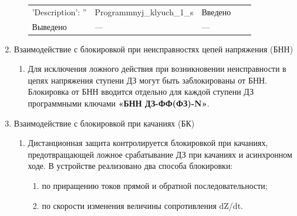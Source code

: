 \begin{enumerate}[label=\arabic{section}.\arabic{subsection}.\arabic{enumi}, labelsep=4pt, leftmargin=0pt, itemindent=57pt, itemsep=0pt, parsep=5pt]
\begin{enumerate}[label=\arabic{section}.\arabic{subsection}.\arabic{enumi}.\arabic*, labelsep=4pt, leftmargin=0em, itemindent=65pt, parsep=0pt]
\begin{longtable}{|>{\centering\arraybackslash}m{5.3cm}|>{\centering\arraybackslash}m{3.3cm}|>{\centering\arraybackslash}m{4.2cm}|>{\centering\arraybackslash}m{1.8cm}|>{\centering\arraybackslash}m{1cm}|}
\raggedright {'Description': ''} & \centering Programmnyj_klyuch_1_s & \centering Введено \\ Выведено & \centering --- & \centering \arraybackslash --- \\
\hline
\end{longtable}
\normalsize

\end{enumerate}


\item\label{sec:secbnn} Взаимодействие с блокировкой при неисправностях цепей напряжения (БНН)
\begin{enumerate}[label=\arabic{section}.\arabic{subsection}.\arabic{enumi}.\arabic*, labelsep=4pt, leftmargin=0em, itemindent=65pt, parsep=0pt]

\item
Для исключения ложного действия при возникновении неисправности в цепях напряжения ступени ДЗ могут быть заблокированы от БНН. Блокировка от БНН вводится отдельно для каждой ступени ДЗ программными ключами \textbf{«БНН ДЗ-ФФ(ФЗ)-N»}.

\end{enumerate}


\item\label{sec:secbk} Взаимодействие с блокировкой при качаниях (БК)
\begin{enumerate}[label=\arabic{section}.\arabic{subsection}.\arabic{enumi}.\arabic*, labelsep=4pt, leftmargin=0em, itemindent=65pt, parsep=0pt]

\item
Дистанционная защита контролируется блокировкой при качаниях, предотвращающей ложное срабатывание ДЗ при качаниях и асинхронном ходе. В устройстве реализовано два способа блокировки:
\begin{enumerate}[label=\arabic*)]
    \item по приращению токов прямой и обратной последовательности;
    \item по скорости изменения величины сопротивления dZ/dt.
\end{enumerate}


\end{enumerate}
\end{enumerate}
